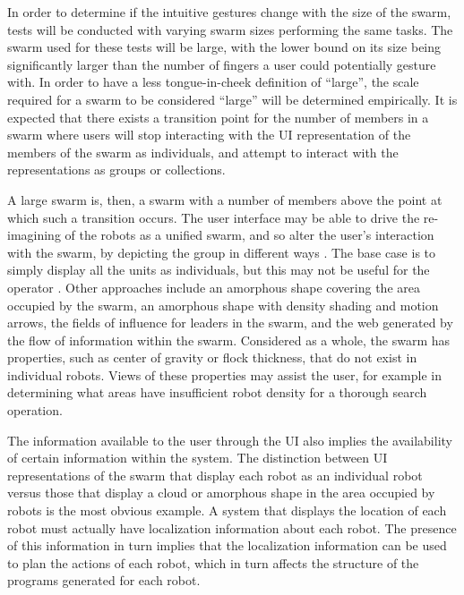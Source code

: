 \documentclass[]{article}
\begin{document}
In order to determine if the intuitive gestures change with the size of the swarm, tests will be conducted with varying swarm sizes performing the same tasks. 
The swarm used for these tests will be large, with the lower bound on its size being significantly larger than the number of fingers a user could potentially gesture with. 
In order to have a less tongue-in-cheek definition of ``large'', the scale required for a swarm to be considered ``large'' will be determined empirically.
It is expected that there exists a transition point for the number of members in a swarm where users will stop interacting with the UI representation of the members of the swarm as individuals, and attempt to interact with the representations as groups or collections. 

A large swarm is, then, a swarm with a number of members above the point at which such a transition occurs. 
The user interface may be able to drive the re-imagining of the robots as a unified swarm, and so alter the user's interaction with the swarm, by depicting the group in different ways \cite{manning2015heuristic}.
The base case is to simply display all the units as individuals, but this may not be useful for the operator \cite{coppin2012controlling}. 
Other approaches include an amorphous shape covering the area occupied by the swarm, an amorphous shape with density shading and motion arrows, the fields of influence for leaders in the swarm, and the web generated by the flow of information within the swarm. 
Considered as a whole, the swarm has properties, such as center of gravity or flock thickness, that do not exist in individual robots. 
Views of these properties may assist the user, for example in determining what areas have insufficient robot density for a thorough search operation. 

The information available to the user through the UI also implies the availability of certain information within the system. 
The distinction between UI representations of the swarm that display each robot as an individual robot versus those that display a cloud or amorphous shape in the area occupied by robots is the most obvious example. 
A system that displays the location of each robot must actually have localization information about each robot.
The presence of this information in turn implies that the localization information can be used to plan the actions of each robot, which in turn affects the structure of the programs generated for each robot. 
\end{document}
